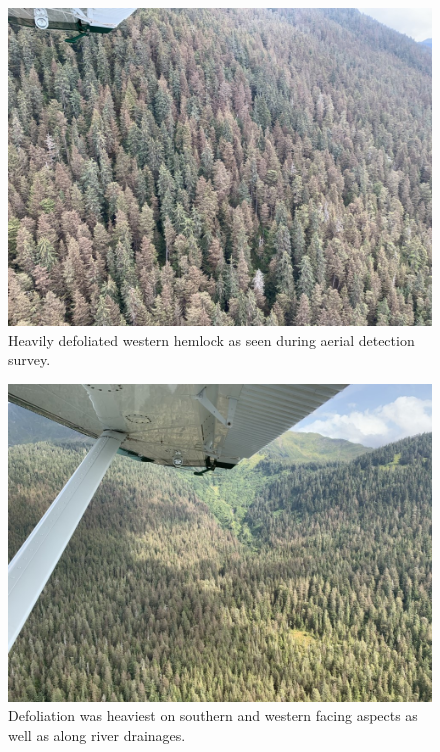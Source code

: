 \begin{multicols}{2}
\begin{figure}[H]
\begin{center}
\vspace{2mm}
\includegraphics[width=\textwidth]{img/hemlock_sawfly_defoliation.jpg}
\caption{Heavily defoliated western hemlock as seen during aerial detection survey.}
\label{hemlock_sawfly_defoliation}
\end{center}
\end{figure} 

\begin{figure}[H]
\begin{center}
\vspace{2mm}
\includegraphics[width=\textwidth]{img/hemlock_sawfly_defoliation_2.jpg}
\caption{Defoliation was heaviest on southern and western facing aspects as well as along river drainages.}
\label{hemlock_sawfly_defoliation_2}
\end{center}
\end{figure} 
  

\end{multicols}
